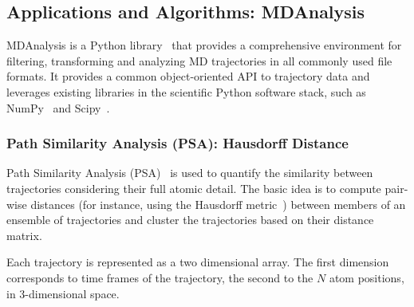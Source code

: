 

\subsection{Applications and Algorithms: MDAnalysis}
\label{ssec:mda}
MDAnalysis is a Python library~\cite{michaud2011mdanalysis,gowers2016mdanalysis} that provides a comprehensive environment for filtering, transforming and analyzing MD trajectories in all commonly used file formats.
It provides a common object-oriented API to trajectory data and leverages existing libraries in the scientific Python software stack, such as NumPy~\cite{numpy} and Scipy~\cite{scipy}.

\subsubsection*{Path Similarity Analysis (PSA): Hausdorff Distance}Path Similarity Analysis (PSA)~\cite{seyler2015path} is used to quantify the similarity between trajectories considering their full atomic detail.
The basic idea is to compute pair-wise distances (for instance, using the Hausdorff metric~\cite{huttenlocher1993comparing}) between members of an ensemble of trajectories and cluster the trajectories based on their distance matrix.

Each trajectory is represented as a two dimensional array.
The first dimension corresponds to time frames of the trajectory, the second to the $N$ atom positions, in 3-dimensional space.

